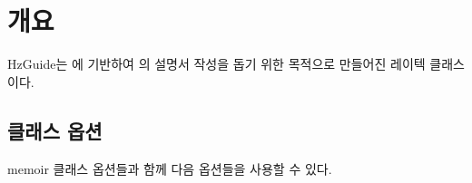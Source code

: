 \documentclass[pairquote, minted]{hzguide}
\begin{document}
\mainmatter*

\chapter{개요}

HzGuide는 에 기반하여 의 설명서 작성을 돕기 위한 목적으로 만들어진 레이텍 클래스이다.

\section{클래스 옵션}

memoir 클래스 옵션들과 함께 다음 옵션들을 사용할 수 있다.

\end{document}
